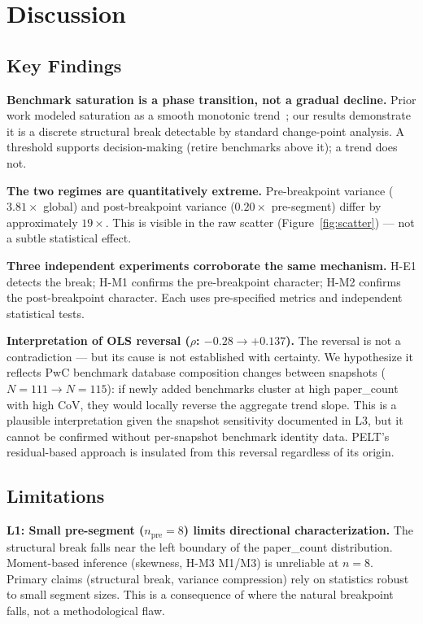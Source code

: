 \section{Discussion}
\label{sec:discussion}

\subsection{Key Findings}

\textbf{Benchmark saturation is a phase transition, not a gradual decline.} Prior work modeled saturation as a smooth monotonic trend~\cite{Liao2022,Akhtar2026}; our results demonstrate it is a discrete structural break detectable by standard change-point analysis. A threshold supports decision-making (retire benchmarks above it); a trend does not.

\textbf{The two regimes are quantitatively extreme.} Pre-breakpoint variance ($3.81\times$ global) and post-breakpoint variance ($0.20\times$ pre-segment) differ by approximately $19\times$. This is visible in the raw scatter (Figure~\ref{fig:scatter}) --- not a subtle statistical effect.

\textbf{Three independent experiments corroborate the same mechanism.} H-E1 detects the break; H-M1 confirms the pre-breakpoint character; H-M2 confirms the post-breakpoint character. Each uses pre-specified metrics and independent statistical tests.

\textbf{Interpretation of OLS reversal ($\rho$: $-0.28 \to +0.137$).} The reversal is not a contradiction --- but its cause is not established with certainty. We hypothesize it reflects PwC benchmark database composition changes between snapshots ($N=111 \to N=115$): if newly added benchmarks cluster at high paper\_count with high CoV, they would locally reverse the aggregate trend slope. This is a plausible interpretation given the snapshot sensitivity documented in L3, but it cannot be confirmed without per-snapshot benchmark identity data. PELT's residual-based approach is insulated from this reversal regardless of its origin.

\subsection{Limitations}
\label{sec:limitations}

\textbf{L1: Small pre-segment ($n_{\text{pre}}=8$) limits directional characterization.} The structural break falls near the left boundary of the paper\_count distribution. Moment-based inference (skewness, H-M3 M1/M3) is unreliable at $n=8$. Primary claims (structural break, variance compression) rely on statistics robust to small segment sizes. This is a consequence of where the natural breakpoint falls, not a methodological flaw.

